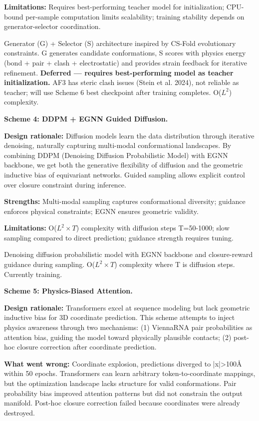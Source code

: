 \documentclass[12pt]{article}
\begin{document}
\textbf{Limitations:} Requires best-performing teacher model for initialization; CPU-bound per-sample computation limits scalability; training stability depends on generator-selector coordination.

Generator (G) + Selector (S) architecture inspired by CS-Fold evolutionary constraints. G generates candidate conformations, S scores with physics energy (bond + pair + clash + electrostatic) and provides strain feedback for iterative refinement. \textbf{Deferred — requires best-performing model as teacher initialization.} AF3 has steric clash issues (Stein et al. 2024), not reliable as teacher; will use Scheme 6 best checkpoint after training completes. O($L^2$) complexity.

\textbf{Scheme 4: DDPM + EGNN Guided Diffusion.}

\textbf{Design rationale:} Diffusion models learn the data distribution through iterative denoising, naturally capturing multi-modal conformational landscapes. By combining DDPM (Denoising Diffusion Probabilistic Model) \citep{ho2020} with EGNN backbone, we get both the generative flexibility of diffusion and the geometric inductive bias of equivariant networks. Guided sampling allows explicit control over closure constraint during inference.

\textbf{Strengths:} Multi-modal sampling captures conformational diversity; guidance enforces physical constraints; EGNN ensures geometric validity.

\textbf{Limitations:} O($L^2 \times T$) complexity with diffusion steps T=50-1000; slow sampling compared to direct prediction; guidance strength requires tuning.

Denoising diffusion probabilistic model \citep{ho2020} with EGNN backbone and closure-reward guidance during sampling. O($L^2 \times T$) complexity where T is diffusion steps. Currently training.

\textbf{Scheme 5: Physics-Biased Attention.}

\textbf{Design rationale:} Transformers excel at sequence modeling but lack geometric inductive bias for 3D coordinate prediction. This scheme attempts to inject physics awareness through two mechanisms: (1) ViennaRNA pair probabilities as attention bias, guiding the model toward physically plausible contacts; (2) post-hoc closure correction after coordinate prediction.

\textbf{What went wrong:} Coordinate explosion, predictions diverged to |x|>100Å within 50 epochs. Transformers can learn arbitrary token-to-coordinate mappings, but the optimization landscape lacks structure for valid conformations. Pair probability bias improved attention patterns but did not constrain the output manifold. Post-hoc closure correction failed because coordinates were already destroyed.
\end{document}
